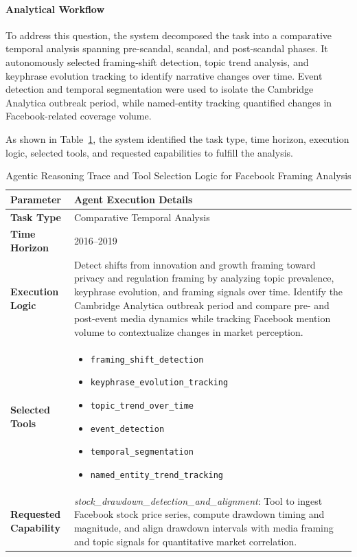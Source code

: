 \pagebreak

\paragraph{Analytical Workflow}

To address this question, the system decomposed the task into a comparative temporal analysis spanning pre-scandal, scandal, and post-scandal phases. It autonomously selected framing-shift detection, topic trend analysis, and keyphrase evolution tracking to identify narrative changes over time. Event detection and temporal segmentation were used to isolate the Cambridge Analytica outbreak period, while named-entity tracking quantified changes in Facebook-related coverage volume.

As shown in Table~\ref{tab:agentic_reasoning_facebook}, the system identified the task type, time horizon, execution logic, selected tools, and requested capabilities to fulfill the analysis.

\begin{table}[h!]
\centering
\caption{Agentic Reasoning Trace and Tool Selection Logic for Facebook Framing Analysis}
\label{tab:agentic_reasoning_facebook}
\small
\renewcommand{\arraystretch}{1.4}
\begin{tabular}{@{}p{} p{}@{}}
\toprule
\textbf{Parameter} & \textbf{Agent Execution Details} \\ \midrule
\textbf{Task Type} & Comparative Temporal Analysis \\
\textbf{Time Horizon} & 2016--2019 \\
\textbf{Execution Logic} & Detect shifts from innovation and growth framing toward privacy and regulation framing by analyzing topic prevalence, keyphrase evolution, and framing signals over time. Identify the Cambridge Analytica outbreak period and compare pre- and post-event media dynamics while tracking Facebook mention volume to contextualize changes in market perception. \\
\textbf{Selected Tools} & \begin{itemize}[nosep, leftmargin=*]
    \item \texttt{framing\_shift\_detection}
    \item \texttt{keyphrase\_evolution\_tracking}
    \item \texttt{topic\_trend\_over\_time}
    \item \texttt{event\_detection}
    \item \texttt{temporal\_segmentation}
    \item \texttt{named\_entity\_trend\_tracking}
\end{itemize} \\
\textbf{Requested Capability} & \textit{stock\_drawdown\_detection\_and\_alignment}: Tool to ingest Facebook stock price series, compute drawdown timing and magnitude, and align drawdown intervals with media framing and topic signals for quantitative market correlation. \\ \bottomrule
\end{tabular}
\end{table}

